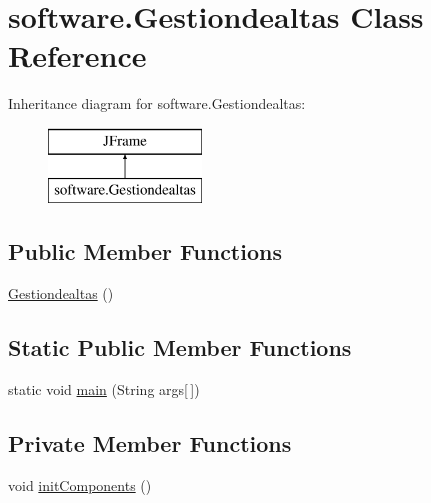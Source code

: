 \hypertarget{classsoftware_1_1_gestiondealtas}{}\section{software.\+Gestiondealtas Class Reference}
\label{classsoftware_1_1_gestiondealtas}
Inheritance diagram for software.\+Gestiondealtas\+:\begin{figure}[H]
\begin{center}
\leavevmode
\includegraphics[height=2.000000cm]{classsoftware_1_1_gestiondealtas}
\end{center}
\end{figure}
\subsection*{Public Member Functions}
\begin{DoxyCompactItemize}
\item 
\mbox{\hyperlink{classsoftware_1_1_gestiondealtas_a00ba9520dbcc70ceaf94eccc527ea915}{Gestiondealtas}} ()
\end{DoxyCompactItemize}
\subsection*{Static Public Member Functions}
\begin{DoxyCompactItemize}
\item 
static void \mbox{\hyperlink{classsoftware_1_1_gestiondealtas_a07b517e675deeae33168917974b29ca8}{main}} (String args\mbox{[}$\,$\mbox{]})
\end{DoxyCompactItemize}
\subsection*{Private Member Functions}
\begin{DoxyCompactItemize}
\item 
void \mbox{\hyperlink{classsoftware_1_1_gestiondealtas_ac4320b7b16692e44ece6ddc1a75450d9}{init\+Components}} ()
\end{DoxyCompactItemize}
